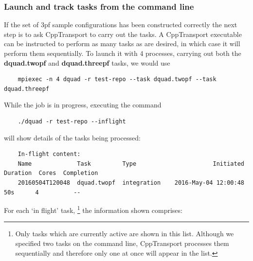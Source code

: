 \documentclass[11pt,a4paper]{article}
\newcommand{\repoobject}[1]{{\ttfamily\bfseries\small #1}}
\newcommand{\packagefont}{\sffamily}
\newcommand{\CppTransport}{{\packagefont CppTransport}}
\begin{document}
\subsubsection{Launch and track tasks from the command line}
If the set of 3pf sample configurations has been constructed correctly
the next step is to ask {\CppTransport} to carry out the tasks.
A {\CppTransport} executable can be instructed to
perform as many tasks as are desired,
in which case it will perform them sequentially.
To launch it with 4 processes, carrying out both the
\repoobject{dquad.twopf} and
\repoobject{dquad.threepf} tasks, we would use
\begin{verbatim}
    mpiexec -n 4 dquad -r test-repo --task dquad.twopf --task dquad.threepf    
\end{verbatim}
While the job is in progress, executing the command
\begin{verbatim}
    ./dquad -r test-repo --inflight    
\end{verbatim}
will show details of the tasks being processed:
\begin{verbatim}
    In-flight content:
    Name             Task         Type                      Initiated  Duration  Cores  Completion
    20160504T120048  dquad.twopf  integration    2016-May-04 12:00:48       50s      4          --
\end{verbatim}
For each `in flight' task,%
    \footnote{Only tasks which are currently active are shown in this list. Although we specified
    two tasks on the command line, {\CppTransport} processes them sequentially and therefore
    only one at once will appear in the list.}
the information shown comprises:
\end{document}

